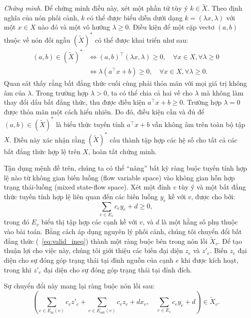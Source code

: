 \textit{Chứng minh.}
Để chứng minh điều này, xét một phần tử tùy ý $k \in \tilde{X}$. Theo định nghĩa của nón phối cảnh, $k$ có thể được biểu diễn dưới dạng $k = (\lambda x, \lambda)$ với một $x \in X$ nào đó và một vô hướng $\lambda \ge 0$. Điều kiện để một cặp vectơ $(a, b)$ thuộc về nón đối ngẫu $(\tilde{X})^*$ có thể được khai triển như sau:
\begin{align}
    (a, b) \in (\tilde{X})^* &\iff (a, b)^\top (\lambda x, \lambda) \ge 0, \quad \forall x \in X, \forall \lambda \ge 0 \nonumber \\
    &\iff \lambda (a^\top x + b) \ge 0, \quad \forall x \in X, \forall \lambda \ge 0.
\end{align}
Quan sát thấy rằng bất đẳng thức cuối cùng phải thỏa mãn với mọi giá trị không âm của $\lambda$. Trong trường hợp $\lambda > 0$, ta có thể chia cả hai vế cho $\lambda$ mà không làm thay đổi dấu bất đẳng thức, thu được điều kiện $a^\top x + b \ge 0$. Trường hợp $\lambda = 0$ được thỏa mãn một cách hiển nhiên. Do đó, điều kiện cần và đủ để $(a, b) \in (\tilde{X})^*$ là biểu thức tuyến tính $a^\top x + b$ vẫn không âm trên toàn bộ tập $X$. Điều này xác nhận rằng $(\tilde{X})^*$ cấu thành tập hợp các hệ số cho tất cả các bất đẳng thức hợp lệ trên $X$, hoàn tất chứng minh.


Tận dụng mệnh đề trên, chúng ta có thể ``nâng'' bất kỳ ràng buộc tuyến tính hợp lệ nào từ không gian biến luồng (flow variable space) vào không gian hỗn hợp trạng thái-luồng (mixed state-flow space). Xét một đỉnh $v$ tùy ý và một bất đẳng thức tuyến tính hợp lệ liên quan đến các biến luồng $y_e$ kề với $v$, được cho bởi:
\begin{equation}
    \sum_{e \in E_v} c_e y_e + d \ge 0, \label{eq:valid_ineq}
\end{equation}
trong đó $E_v$ biểu thị tập hợp các cạnh kề với $v$, và $d$ là một hằng số phụ thuộc vào bài toán. Bằng cách áp dụng nguyên lý phối cảnh, chúng tôi chuyển đổi bất đẳng thức (~\ref{eq:valid_ineq}) thành một ràng buộc bên trong nón lồi $\tilde{X}_v$. Để tạo thuận lợi cho việc này, chúng tôi giới thiệu các biến đại diện $z_e$ và $z'_e$. Biến $z_e$ đại diện cho sự đóng góp trạng thái tại đỉnh nguồn của cạnh $e$ khi được kích hoạt, trong khi $z'_e$ đại diện cho sự đóng góp trạng thái tại đỉnh đích.

Sự chuyển đổi này mang lại ràng buộc nón lồi sau:
\begin{equation}
    \left( \sum_{e \in E_{\text{in}}(v)} c_e z'_e + \sum_{e \in E_{\text{out}}(v)} c_e z_e + d x_v, \quad \sum_{e \in E_v} c_e y_e + d \right) \in \tilde{X}_v. \label{eq:lifted_constraint}
\end{equation}


